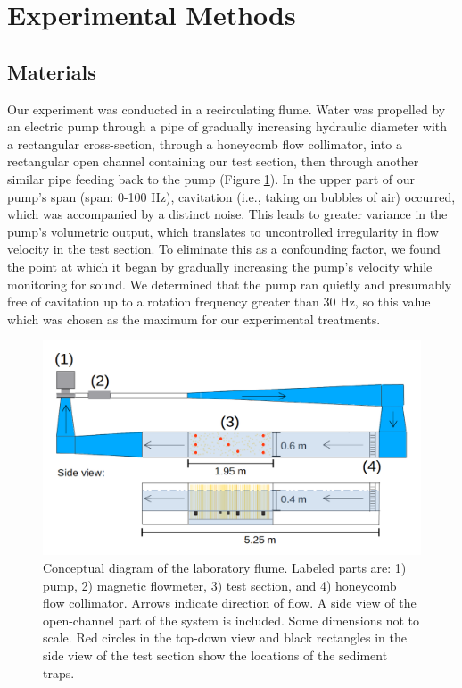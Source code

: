 \documentclass{scrreprt}
\begin{document}
\section{Experimental Methods}

\subsection{Materials}

Our experiment was conducted in a recirculating flume. Water was propelled by an electric pump through a pipe of gradually increasing hydraulic diameter with a rectangular cross-section, through a honeycomb flow collimator, into a rectangular open channel containing our test section, then through another similar pipe feeding back to the pump (Figure \ref{fig:floorplan}). In the upper part of our pump's span (span: 0-100 Hz), cavitation (i.e., taking on bubbles of air) occurred, which was accompanied by a distinct noise. This leads to greater variance in the pump's volumetric output, which translates to uncontrolled irregularity in flow velocity in the test section. To eliminate this as a confounding factor, we found the point at which it began by gradually increasing the pump's velocity while monitoring for sound. We determined that the pump ran quietly and presumably free of cavitation up to a rotation frequency greater than 30 Hz, so this value which was chosen as the maximum for our experimental treatments.

\begin{figure}[htbp]
\includegraphics[width=15cm]{pics/flume_with_sedtraps.png}
\centering
\caption{Conceptual diagram of the laboratory flume. Labeled parts are: 1) pump, 2) magnetic flowmeter, 3) test section, and 4) honeycomb flow collimator. Arrows indicate direction of flow. A side view of the open-channel part of the system is included. Some dimensions not to scale. Red circles in the top-down view and black rectangles in the side view of the test section show the locations of the sediment traps.}
\label{fig:floorplan}
\end{figure}
\end{document}
